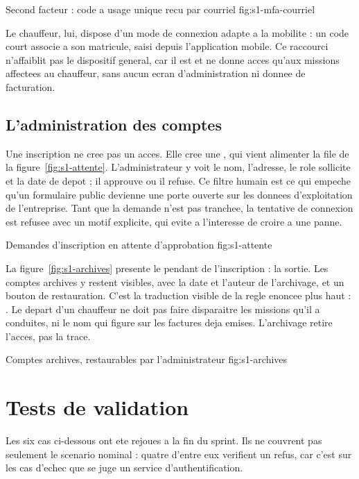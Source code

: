   {Second facteur : code a usage unique recu par courriel}
  {fig:s1-mfa-courriel}

Le chauffeur, lui, dispose d'un mode de connexion adapte a la mobilite :
un code court associe a son matricule, saisi depuis l'application mobile.
Ce raccourci n'affaiblit pas le dispositif general, car il est
 et ne donne acces qu'aux missions
affectees au chauffeur, sans aucun ecran d'administration ni donnee de
facturation.

\subsection{L'administration des comptes}

Une inscription ne cree pas un acces. Elle cree une ,
qui vient alimenter la file de la figure~\ref{fig:s1-attente}.
L'administrateur y voit le nom, l'adresse, le role sollicite et la date de
depot ; il approuve ou il refuse. Ce filtre humain est ce qui empeche
qu'un formulaire public devienne une porte ouverte sur les donnees
d'exploitation de l'entreprise. Tant que la demande n'est pas tranchee, la
tentative de connexion est refusee avec un motif explicite, qui evite a
l'interesse de croire a une panne.

  {Demandes d'inscription en attente d'approbation}
  {fig:s1-attente}

La figure~\ref{fig:s1-archives} presente le pendant de l'inscription : la
sortie. Les comptes archives y restent visibles, avec la date et l'auteur
de l'archivage, et un bouton de restauration. C'est la traduction visible
de la regle enoncee plus haut : . Le depart d'un chauffeur ne doit pas
faire disparaitre les missions qu'il a conduites, ni le nom qui figure sur
les factures deja emises. L'archivage retire l'acces, pas la trace.

  {Comptes archives, restaurables par l'administrateur}
  {fig:s1-archives}

\section{Tests de validation}

Les six cas ci-dessous ont ete rejoues a la fin du sprint. Ils ne
couvrent pas seulement le scenario nominal : quatre d'entre eux verifient
un refus, car c'est sur les cas d'echec que se juge un service
d'authentification.

